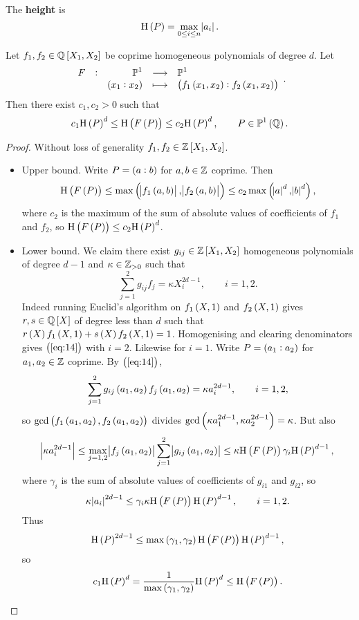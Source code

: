 \begin{definition*}
The \textbf{height} is
$$ \H\br{P} = \max_{0 \le i \le n} \abs{a_i}. $$
\end{definition*}

\begin{lemma}
\label{lem:13.1}
Let $ f_1, f_2 \in \QQ\sbr{X_1, X_2} $ be coprime homogeneous polynomials of degree $ d $. Let
$$ \function[F]{\PP^1}{\PP^1}{\br{x_1 : x_2}}{\br{f_1\br{x_1, x_2} : f_2\br{x_1, x_2}}}. $$
Then there exist $ c_1, c_2 > 0 $ such that
$$ c_1\H\br{P}^d \le \H\br{F\br{P}} \le c_2\H\br{P}^d, \qquad P \in \PP^1\br{\QQ}. $$
\end{lemma}

\begin{proof}
Without loss of generality $ f_1, f_2 \in \ZZ\sbr{X_1, X_2} $.
\begin{itemize}
\item Upper bound. Write $ P = \br{a : b} $ for $ a, b \in \mathbb{Z} $ coprime. Then
$$ \H\br{F\br{P}} \le \max\br{\abs{f_1\br{a, b}}, \abs{f_2\br{a, b}}} \le c_2\max\br{\abs{a}^d, \abs{b}^d}, $$
where $ c_2 $ is the maximum of the sum of absolute values of coefficients of $ f_1 $ and $ f_2 $, so $ \H\br{F\br{P}} \le c_2\H\br{P}^d $.
\item Lower bound. We claim there exist $ g_{ij} \in \ZZ\sbr{X_1, X_2} $ homogeneous polynomials of degree $ d - 1 $ and $ \kappa \in \mathbb{Z}_{> 0} $ such that
\begin{equation}
\label{eq:14}
\sum_{j = 1}^2 g_{ij}f_j = \kappa X_i^{2d - 1}, \qquad i = 1, 2.
\end{equation}
Indeed running Euclid's algorithm on $ f_1\br{X, 1} $ and $ f_2\br{X, 1} $ gives $ r, s \in \QQ\sbr{X} $ of degree less than $ d $ such that $ r\br{X}f_1\br{X, 1} + s\br{X}f_2\br{X, 1} = 1 $. Homogenising and clearing denominators gives $ \br{\ref{eq:14}} $ with $ i = 2 $. Likewise for $ i = 1 $. Write $ P = \br{a_1 : a_2} $ for $ a_1, a_2 \in \mathbb{Z} $ coprime. By $ \br{\ref{eq:14}} $,
$$ \sum_{j = 1}^2 g_{ij}\br{a_1, a_2}f_j\br{a_1, a_2} = \kappa a_i^{2d - 1}, \qquad i = 1, 2, $$
so $ \gcd\br{f_1\br{a_1, a_2}, f_2\br{a_1, a_2}} $ divides $ \gcd\br{\kappa a_1^{2d - 1}, \kappa a_2^{2d - 1}} = \kappa $. But also
$$ \abs{\kappa a_i^{2d - 1}} \le \max_{j = 1, 2} \abs{f_j\br{a_1, a_2}}\sum_{j = 1}^2 \abs{g_{ij}\br{a_1, a_2}} \le \kappa\H\br{F\br{P}}\gamma_i\H\br{P}^{d - 1}, $$
where $ \gamma_i $ is the sum of absolute values of coefficients of $ g_{i1} $ and $ g_{i2} $, so
$$ \kappa\abs{a_i}^{2d - 1} \le \gamma_i\kappa\H\br{F\br{P}}\H\br{P}^{d - 1}, \qquad i = 1, 2. $$
Thus
$$ \H\br{P}^{2d - 1} \le \max\br{\gamma_1, \gamma_2}\H\br{F\br{P}}\H\br{P}^{d - 1}, $$
so
$$ c_1\H\br{P}^d = \dfrac{1}{\max\br{\gamma_1, \gamma_2}}\H\br{P}^d \le \H\br{F\br{P}}. $$
\end{itemize}
\end{proof}

